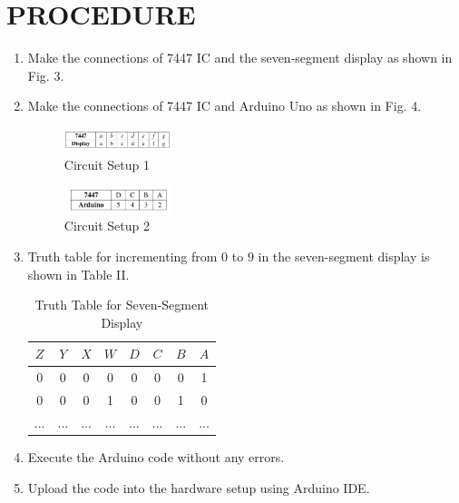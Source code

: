 \documentclass[conference]{IEEEtran}
\begin{document}
\section{PROCEDURE}
\begin{enumerate}
\item Make the connections of 7447 IC and the seven-segment display as shown in Fig. 3.
\item Make the connections of 7447 IC and Arduino Uno as shown in Fig. 4.

\begin{figure}[htbp] 
\centering 
\includegraphics[width=0.3\textwidth]{7447044.jpg}
\caption{\label{fig-3:Gates} Circuit Setup 1}    
\end{figure}

\begin{figure}[htbp]                     
\centering                           
\includegraphics[width=0.3\textwidth]{744705.jpg}                                 
\caption{\label{fig-4:Gates} Circuit Setup 2}         
\end{figure}

\item Truth table for incrementing from $0$ to $9$ in the seven-segment display is shown in Table II.

\begin{table}[htbp]
\centering
\begin{tabular}{| c | c | c | c | c | c | c | c |} 
\hline
	$Z$ & $Y$ & $X$ & $W$ & $D$ & $C$ & $B$ & $A$ \\
\hline
0   & 0   & 0   & 0   & 0  & 0 & 0  & 1 \\
0   & 0   & 0   & 1   & 0  & 0 & 1  & 0 \\
... & ... & ... & ... & ... & ... & ... & ... \\ 
\hline
\end{tabular}
\vspace{0.15cm}
\caption{\label{tab:widgets} Truth Table for Seven-Segment Display}
\end{table}

\item Execute the Arduino code without any errors.
\item Upload the code into the hardware setup using Arduino IDE.
\end{enumerate}
\end{document}

